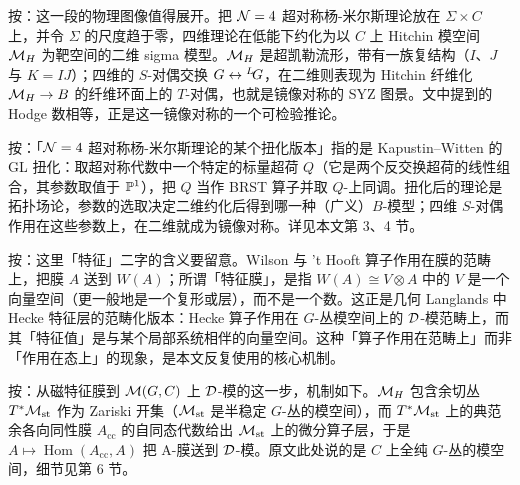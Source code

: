 \begin{yizhu}[物理图像]
按：这一段的物理图像值得展开。把 ${\EUN}=4$ 超对称杨-米尔斯理论放在 $\Sigma\times C$ 上，并令 $\Sigma$ 的尺度趋于零，四维理论在低能下约化为以 $C$ 上 Hitchin 模空间 ${\EUM}_H$ 为靶空间的二维 sigma 模型。${\EUM}_H$ 是超凯勒流形，带有一族复结构（$I$、$J$ 与 $K=IJ$）；四维的 $S$-对偶交换 $G\leftrightarrow{}^L\negthinspace G$，在二维则表现为 Hitchin 纤维化 ${\EUM}_H\to B$ 的纤维环面上的 $T$-对偶，也就是镜像对称的 SYZ 图景。文中提到的 Hodge 数相等，正是这一镜像对称的一个可检验推论。
\end{yizhu}

\begin{yizhu}[含糊点拨]
按：「${\EUN}=4$ 超对称杨-米尔斯理论的某个扭化版本」指的是 Kapustin--Witten 的 GL 扭化：取超对称代数中一个特定的标量超荷 $Q$（它是两个反交换超荷的线性组合，其参数取值于 $\Bbb{P}^1$），把 $Q$ 当作 BRST 算子并取 $Q$-上同调。扭化后的理论是拓扑场论，参数的选取决定二维约化后得到哪一种（广义）$B$-模型；四维 $S$-对偶作用在这些参数上，在二维就成为镜像对称。详见本文第 3、4 节。
\end{yizhu}

\begin{yizhu}[物理图像]
按：这里「特征」二字的含义要留意。Wilson 与 't Hooft 算子作用在膜的范畴上，把膜 $A$ 送到 $W(A)$；所谓「特征膜」，是指 $W(A)\cong V\otimes A$ 中的 $V$ 是一个向量空间（更一般地是一个复形或层），而不是一个数。这正是几何 Langlands 中 Hecke 特征层的范畴化版本：Hecke 算子作用在 $G$-丛模空间上的 ${\cal D}$-模范畴上，而其「特征值」是与某个局部系统相伴的向量空间。这种「算子作用在范畴上」而非「作用在态上」的现象，是本文反复使用的核心机制。
\end{yizhu}

\begin{yizhu}[含糊点拨]
按：从磁特征膜到 ${\EUM}(G,C)$ 上 ${\cal D}$-模的这一步，机制如下。${\EUM}_H$ 包含余切丛 $T^*{\EUM}_{\mathrm{st}}$ 作为 Zariski 开集（${\EUM}_{\mathrm{st}}$ 是半稳定 $G$-丛的模空间），而 $T^*{\EUM}_{\mathrm{st}}$ 上的典范余各向同性膜 $A_{\mathrm{cc}}$ 的自同态代数给出 ${\EUM}_{\mathrm{st}}$ 上的微分算子层，于是 $A\mapsto\operatorname{Hom}(A_{\mathrm{cc}},A)$ 把 A-膜送到 ${\cal D}$-模。原文此处说的是 $C$ 上全纯 $G$-丛的模空间，细节见第 6 节。
\end{yizhu}
